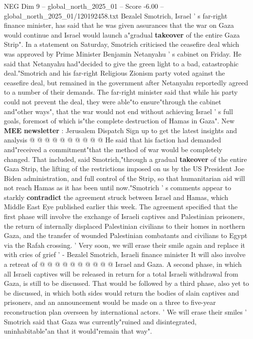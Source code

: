 \begin{textsample}{NEG Dim 9 – global\_north\_2025\_01 – Score -6.00 – global\_north\_2025\_01/120192458.txt}  \label{ex:f9_neg_105}
Bezalel Smotrich, Israel ' s far-right finance minister, has said that he was given assurances that the war on Gaza would continue and Israel would launch a"gradual \textbf{takeover} of the entire Gaza Strip".
In a statement on Saturday, Smotrich criticised the ceasefire deal which was approved by Prime Minister Benjamin Netanyahu ' s cabinet on Friday.
He said that Netanyahu had"decided to give the green light to a bad, catastrophic deal."Smotrich and his far-right Religious Zionism party voted against the ceasefire deal, but remained in the government after Netanyahu reportedly agreed to a number of their demands.
The far-right minister said that while his party could not prevent the deal, they were able"to ensure"through the cabinet and"other ways", that the war would not end without achieving Israel ' s full goals, foremost of which is"the complete destruction of Hamas in Gaza".
New \textbf{MEE} \textbf{newsletter} : Jerusalem Dispatch Sign up to get the latest insights and analysis @ @ @ @ @ @ @ @ @ @ He said that his faction had demanded and"received a commitment"that the method of war would be completely changed.
That included, said Smotrich,"through a gradual \textbf{takeover} of the entire Gaza Strip, the lifting of the restrictions imposed on us by the US President Joe Biden administration, and full control of the Strip, so that humanitarian aid will not reach Hamas as it has been until now."Smotrich ' s comments appear to starkly \textbf{contradict} the agreement struck between Israel and Hamas, which Middle East Eye published earlier this week.
The agreement specified that the first phase will involve the exchange of Israeli captives and Palestinian prisoners, the return of internally displaced Palestinian civilians to their homes in northern Gaza, and the transfer of wounded Palestinian combatants and civilians to Egypt via the Rafah crossing. ' Very soon, we will erase their smile again and replace it with cries of grief ' - Bezalel Smotrich, Israeli finance minister It will also involve a retreat of @ @ @ @ @ @ @ @ @ @ Israel and Gaza.
A second phase, in which all Israeli captives will be released in return for a total Israeli withdrawal from Gaza, is still to be discussed.
That would be followed by a third phase, also yet to be discussed, in which both sides would return the bodies of slain captives and prisoners, and an announcement would be made on a three to five-year reconstruction plan overseen by international actors. ' We will erase their smiles ' Smotrich said that Gaza was currently"ruined and disintegrated, uninhabitable"an that it would"remain that way".

\end{textsample}
